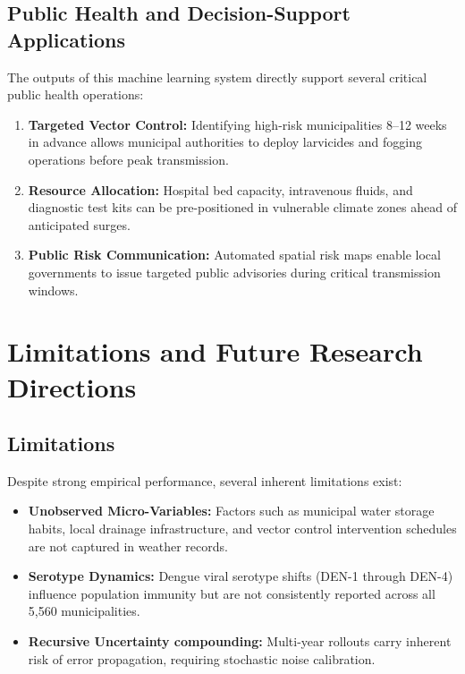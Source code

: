 \documentclass[journal,onecolumn,11pt]{IEEEtran}
\begin{document}
\subsection{Public Health and Decision-Support Applications}
The outputs of this machine learning system directly support several critical public health operations:
\begin{enumerate}
    \item \textbf{Targeted Vector Control:} Identifying high-risk municipalities 8--12 weeks in advance allows municipal authorities to deploy larvicides and fogging operations before peak transmission.
    \item \textbf{Resource Allocation:} Hospital bed capacity, intravenous fluids, and diagnostic test kits can be pre-positioned in vulnerable climate zones ahead of anticipated surges.
    \item \textbf{Public Risk Communication:} Automated spatial risk maps enable local governments to issue targeted public advisories during critical transmission windows.
\end{enumerate}

\section{Limitations and Future Research Directions}

\subsection{Limitations}
Despite strong empirical performance, several inherent limitations exist:
\begin{itemize}
    \item \textbf{Unobserved Micro-Variables:} Factors such as municipal water storage habits, local drainage infrastructure, and vector control intervention schedules are not captured in weather records.
    \item \textbf{Serotype Dynamics:} Dengue viral serotype shifts (DEN-1 through DEN-4) influence population immunity but are not consistently reported across all 5,560 municipalities.
    \item \textbf{Recursive Uncertainty compounding:} Multi-year rollouts carry inherent risk of error propagation, requiring stochastic noise calibration.
\end{itemize}
\end{document}
